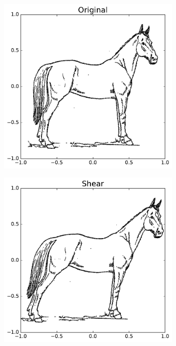 \begin{figure}[H] %
\captionsetup[subfigure]{justification=centering}
\centering
\begin{subfigure}{.5\textwidth}
    \centering
    \includegraphics[width=\linewidth]{originalHorse.pdf}
\end{subfigure}%
\begin{subfigure}{.5\textwidth}
    \centering
    \includegraphics[width=\linewidth]{ShearHorse.pdf}
\end{subfigure}
\end{figure}



